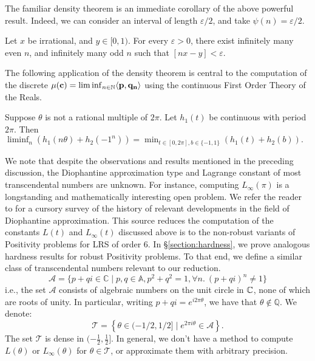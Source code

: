 The familiar density theorem is an immediate corollary of the above powerful result. Indeed, we can consider an interval of length $\varepsilon/2$, and take $\psi(n) = \varepsilon/2$.
\begin{lemma}
\label{lemma:density}
Let $x$ be irrational, and $y \in [0, 1)$. For every $\varepsilon > 0$, there exist infinitely many even $n$, and infinitely many odd $n$ such that $[nx - y] < \varepsilon$.
\end{lemma}

The following application of the density theorem is central to the computation of the discrete $\mu(\mathbf{c}) = \liminf_{n\in \mathbb{N}}\langle\mathbf{p}, \mathbf{q_n}\rangle$ using the continuous First Order Theory of the Reals.
\begin{lemma}
\label{eq:liminfmin}
Suppose $\theta$ is not a rational multiple of $2\pi$. Let $h_1(t)$ be continuous with period $2\pi$. Then
$
\liminf_n \left(h_1(n\theta) + h_2(-1^n)\right) = \min_{t \in [0, 2\pi], b\in \{-1, 1\}} \left(h_1(t) + h_2(b)\right).
$
\end{lemma}

We note that despite the observations and results mentioned in the preceding discussion, the Diophantine approximation type and Lagrange constant of most transcendental numbers are unknown. For instance, computing $L_\infty(\pi)$ is a longstanding and mathematically interesting open problem. We refer the reader to \cite[Section 5]{joeljames3} for a cursory survey of the history of relevant developments in the field of Diophantine approximation. This source reduces the computation of the constants $L(t)$ and $L_\infty(t)$ discussed above is to the non-robust variants of Positivity problems for LRS of order 6. In \S\ref{section:hardness}, we prove analogous hardness results for robust Positivity problems. To that end, we define a similar class of transcendental numbers relevant to our reduction.
\begin{equation}
\mathcal A=\{p+q i \in \mathbb{C} \mid p,q \in \mathbb{A}, p^2+q^2=1, \forall n.~(p + qi)^n \ne 1\}
\end{equation}
i.e., the set $\mathcal A$ consists of algebraic numbers on the unit circle in $\mathbb{C}$, none of which are roots of unity. In particular, writing $p+q i= e^{i 2 \pi \theta}$, we have that $\theta \notin \mathbb{Q}$. We denote:
\begin{equation}
\label{eq:keyset}
\mathcal{T} = \left\{ \theta \in (- 1/2, 1/2] \mid e^{2 \pi i \theta} \in \mathcal{A}\right\}.
\end{equation}
The set $\mathcal{T}$ is dense in $(- \frac 1 2, \frac 1 2]$. In general, we don't have a method to compute $L(\theta)$ or $L_\infty(\theta)$ for $\theta \in \mathcal{T}$, or approximate them with arbitrary precision.

